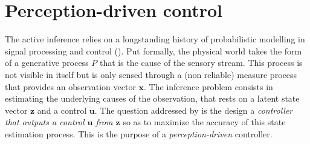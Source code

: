 \documentclass{article} %
\begin{document}

\section{Perception-driven control}
The active inference relies on a longstanding history of probabilistic modelling in signal processing and control (\cite{Kalman1960,Baum1966,friston1994statistical}).  Put formally, the physical world  takes the form of a generative process $P$ that is the cause of the sensory stream. This process is not visible in itself but is only sensed through a (non reliable) measure process that provides an observation vector $\boldsymbol{x}$. The inference problem consists in estimating the underlying causes of the observation, that rests on a latent state vector $\boldsymbol{z}$ and a control $\boldsymbol{u}$. 
The question addressed by \cite{friston2012perceptions} is the design a \emph{controller} \emph{that outputs a control $\boldsymbol{u}$ from $\boldsymbol{z}$} so as to maximize the accuracy of this state estimation process. This is the purpose of a \emph{perception-driven} controller.
\end{document}
